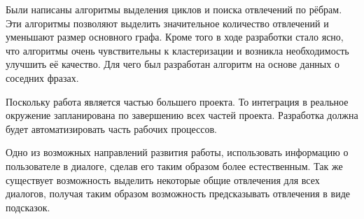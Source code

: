 \documentclass[specification,annotation]{itmo-student-thesis}
\begin{document}
	Были написаны алгоритмы выделения циклов и поиска отвлечений по рёбрам. Эти алгоритмы позволяют выделить значительное количество отвлечений и уменьшают размер основного графа. Кроме того в ходе разработки стало ясно, что алгоритмы очень чувствительны к кластеризации и возникла необходимость улучшить её качество. Для чего был разработан алгоритм на основе данных о соседних фразах.
	
	Поскольку работа является частью большего проекта. То интеграция в реальное окружение запланирована по завершению всех частей проекта. Разработка должна будет автоматизировать часть рабочих процессов.
	
	Одно из возможных направлений развития работы, использовать информацию о пользователе в диалоге, сделав его таким образом более естественным. Так же существует возможность выделить некоторые общие отвлечения для всех диалогов, получая таким образом возможность предсказывать отвлечения в виде подсказок.
	\printmainbibliography
	
	
\end{document}
